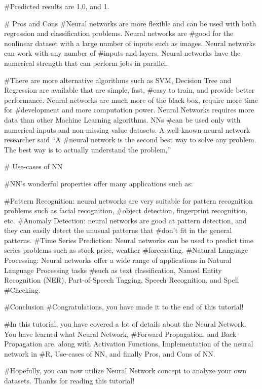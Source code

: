 \documentclass[
]{article}
\begin{document}
\#Predicted results are 1,0, and 1.

\# Pros and Cons \#Neural networks are more flexible and can be used
with both regression and classification problems. Neural networks are
\#good for the nonlinear dataset with a large number of inputs such as
images. Neural networks can work with any number of \#inputs and layers.
Neural networks have the numerical strength that can perform jobs in
parallel.

\#There are more alternative algorithms such as SVM, Decision Tree and
Regression are available that are simple, fast, \#easy to train, and
provide better performance. Neural networks are much more of the black
box, require more time for \#development and more computation power.
Neural Networks requires more data than other Machine Learning
algorithms. NNs \#can be used only with numerical inputs and non-missing
value datasets. A well-known neural network researcher said ``A \#neural
network is the second best way to solve any problem. The best way is to
actually understand the problem,''

\# Use-cases of NN

\#NN's wonderful properties offer many applications such as:

\#Pattern Recognition: neural networks are very suitable for pattern
recognition problems such as facial recognition, \#object detection,
fingerprint recognition, etc. \#Anomaly Detection: neural networks are
good at pattern detection, and they can easily detect the unusual
patterns that \#don't fit in the general patterns. \#Time Series
Prediction: Neural networks can be used to predict time series problems
such as stock price, weather \#forecasting. \#Natural Language
Processing: Neural networks offer a wide range of applications in
Natural Language Processing tasks \#such as text classification, Named
Entity Recognition (NER), Part-of-Speech Tagging, Speech Recognition,
and Spell \#Checking.

\#Conclusion \#Congratulations, you have made it to the end of this
tutorial!

\#In this tutorial, you have covered a lot of details about the Neural
Network. You have learned what Neural Network, \#Forward Propagation,
and Back Propagation are, along with Activation Functions,
Implementation of the neural network in \#R, Use-cases of NN, and
finally Pros, and Cons of NN.

\#Hopefully, you can now utilize Neural Network concept to analyze your
own datasets. Thanks for reading this tutorial!
\end{document}
